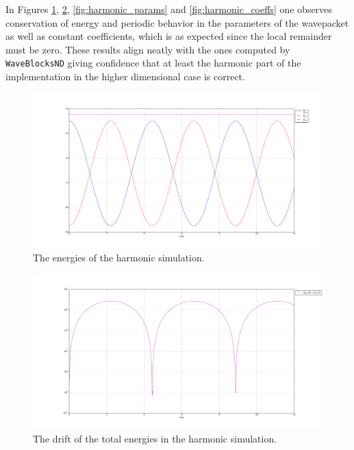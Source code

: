 In Figures \ref{fig:harmonic_energy}, \ref{fig:harmonic_drift}, \ref{fig:harmonic_params} and \ref{fig:harmonic_coeffs} one observes conservation of energy and periodic behavior in the parameters of the wavepacket as well as constant coefficients, which is as expected since the local remainder must be zero. These results align neatly with the ones computed by \texttt{WaveBlocksND} giving confidence that at least the harmonic part of the implementation in the higher dimensional case is correct.
\begin{figure}[!th]
\includegraphics[width=\textwidth]{Figures/harmonic_energy.pdf}
\caption{The energies of the harmonic simulation.}
\label{fig:harmonic_energy}
\end{figure}

\begin{figure}
\includegraphics[width=\textwidth]{Figures/harmonic_drift.pdf}
\caption{The drift of the total energies in the harmonic simulation.}
\label{fig:harmonic_drift}
\end{figure}

